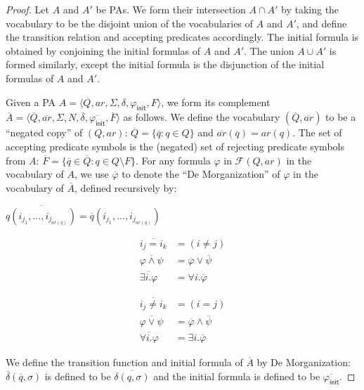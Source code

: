 \documentclass[9pt,nocopyrightspace]{sigplanconf}
\theoremstyle{definition}
\newcommand{\tuple}[1]{\langle #1 \rangle}
\newcommand{\init}{\textsf{init}}
\renewcommand{\phi}{\varphi}
\newcommand{\formulae}{\mathcal{F}}
\newcommand{\ar}{\textit{ar}}
\begin{document}
\propqpaclosure*
\begin{proof}
  Let $A$ and $A'$ be PAs.  We form their intersection $A \cap A'$ by taking
  the vocabulary to be the disjoint union of the vocabularies of $A$ and $A'$,
  and define the transition relation and accepting predicates accordingly.
  The initial formula is obtained by conjoining the initial formulas of $A$
  and $A'$.  The union $A \cup A'$ is formed similarly, except the initial
  formula is the disjunction of the initial formulas of $A$ and $A'$.

  Given a PA $A = \tuple{Q,\ar,\Sigma,\delta,\phi_\init,F}$, we form its
  complement $\overline{A} =
  \tuple{\overline{Q},\overline{\ar},\Sigma,N,\overline{\delta},\overline{\phi_\init},\overline{F}}$
  as follows.  We define the vocabulary $(\overline{Q},\overline{\ar})$ to be a
  ``negated copy'' of $(Q,\ar)$: $\overline{Q} = \{ \overline{q} : q \in
  Q \}$ and $\overline{\ar}(\overline{q}) = \ar(q)$.  The set of accepting
  predicate symbols is the (negated) set of rejecting predicate symbols
  from $A$: $\overline{F} = \{ \overline{q} \in \overline{Q} : q \in Q
  \setminus F \}$.  For any formula $\phi$ in $\formulae(Q,\ar)$ in the vocabulary of $A$, we use
  $\overline{\phi}$ to denote the ``De Morganization'' of $\phi$ in the vocabulary of $\overline{A}$, defined
  recursively by:
  \begin{center}
  $\overline{q(i_{j_1},...,i_{j_{\ar(q)}})} = \overline{q}(i_{j_1},...,i_{j_{\ar(q)}})$\\
    \begin{minipage}[t]{3cm}
      \vspace*{-5pt}
    \begin{align*}
      \overline{i_j = i_k} &= (i \neq j)\\
      \overline{\phi \land \psi} &= \overline{\phi} \lor \overline{\psi}\\
      \overline{\exists i. \phi} &= \forall i. \overline{\phi}
    \end{align*}
  \end{minipage}
  \begin{minipage}[t]{3cm}
      \vspace*{-5pt}
    \begin{align*}
      \overline{i_j \neq i_k} &= (i = j)\\
      \overline{\phi \lor \psi} &= \overline{\phi} \land \overline{\psi}\\
      \overline{\forall i. \phi} &= \exists i. \overline{\phi}
    \end{align*}
  \end{minipage}
  \end{center}

  We define the transition function and initial formula of $\overline{A}$ by
  De Morganization: $\overline{\delta}(\overline{q},\sigma)$ is defined to be
  $\overline{\delta(q,\sigma)}$ and the initial formula is defined to be
  $\overline{\phi_\init}$.
\end{proof}
\end{document}
